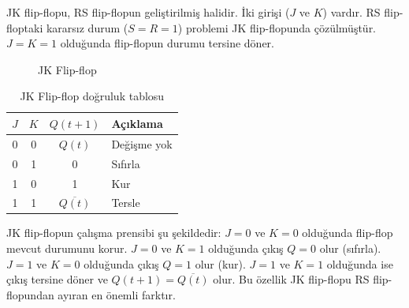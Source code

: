 JK flip-flopu, RS flip-flopun geliştirilmiş halidir. İki girişi ($J$ ve $K$) vardır. RS flip-floptaki kararsız durum ($S = R = 1$) problemi JK flip-flopunda çözülmüştür. $J = K = 1$ olduğunda flip-flopun durumu tersine döner.

\begin{figure}[H]
\centering
{}
\caption{JK Flip-flop}
\label{fig:B.27}
\end{figure}

\begin{table}[H]
\centering
\caption{JK Flip-flop doğruluk tablosu}
\label{tab:B.15}
\begin{tabular}{cc|c|l}
\toprule
$J$ & $K$ & $Q(t+1)$ & \textbf{Açıklama} \\
\midrule
0 & 0 & $Q(t)$ & Değişme yok \\
0 & 1 & 0 & Sıfırla \\
1 & 0 & 1 & Kur \\
1 & 1 & $\overline{Q(t)}$ & Tersle \\
\bottomrule
\end{tabular}
\end{table}

JK flip-flopun çalışma prensibi şu şekildedir: $J = 0$ ve $K = 0$ olduğunda flip-flop mevcut durumunu korur. $J = 0$ ve $K = 1$ olduğunda çıkış $Q = 0$ olur (sıfırla). $J = 1$ ve $K = 0$ olduğunda çıkış $Q = 1$ olur (kur). $J = 1$ ve $K = 1$ olduğunda ise çıkış tersine döner ve $Q(t+1) = \overline{Q(t)}$ olur. Bu özellik JK flip-flopu RS flip-flopundan ayıran en önemli farktır.


